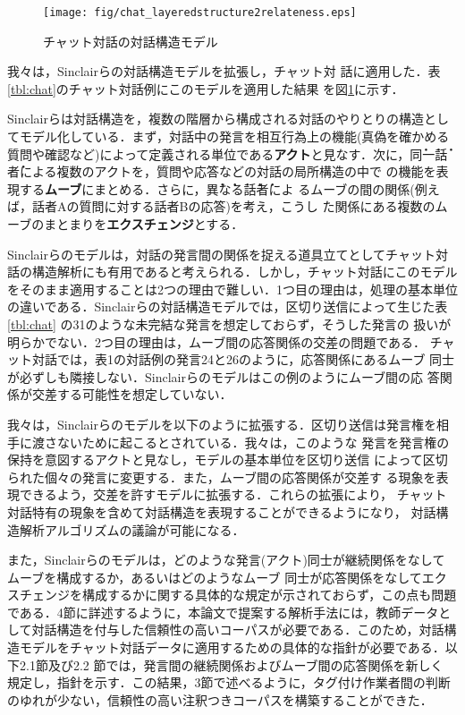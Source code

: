 \begin{figure}[tbt]
 \centerline{
    \texttt{[image: fig/chat\_layeredstructure2relateness.eps]}
  }  
  \caption{チャット対話の対話構造モデル}
  \label{fig:chat_layeredstructure2relateness}
\end{figure}

我々は，Sinclairらの対話構造モデル\cite{Sinclair:92}を拡張し，チャット対
話に適用した．表\ref{tbl:chat}のチャット対話例にこのモデルを適用した結果
を図\ref{fig:chat_layeredstructure2relateness}に示す．

Sinclairらは対話構造を，複数の階層から構成される対話のやりとりの構造とし
てモデル化している．まず，対話中の発言を相互行為上の機能(真偽を確かめる
質問や確認など)によって定義される単位である{\bf アクト}と見なす．次に，\.
同\.一\.話\.者による複数のアクトを，質問や応答などの対話の局所構造の中で
の機能を表現する{\bf ムーブ}にまとめる．さらに，\.異\.な\.る\.話\.者によ
るムーブの間の関係(例えば，話者Aの質問に対する話者Bの応答)を考え，こうし
た関係にある複数のムーブのまとまりを{\bf エクスチェンジ}とする．

Sinclairらのモデルは，対話の発言間の関係を捉える道具立てとしてチャット対
話の構造解析にも有用であると考えられる．しかし，チャット対話にこのモデル
をそのまま適用することは2つの理由で難しい．1つ目の理由は，処理の基本単位
の違いである．Sinclairらの対話構造モデルでは，区切り送信によって生じた表
\ref{tbl:chat} の31のような未完結な発言を想定しておらず，そうした発言の
扱いが明らかでない．2つ目の理由は，ムーブ間の応答関係の交差の問題である．
チャット対話では，表1の対話例の発言24と26のように，応答関係にあるムーブ
同士が必ずしも隣接しない．Sinclairらのモデルはこの例のようにムーブ間の応
答関係が交差する可能性を想定していない．

我々は，Sinclairらのモデルを以下のように拡張する．区切り送信は発言権を相
手に渡さないために起こるとされている\cite{Hosoma:00}．我々は，このような
発言を発言権の保持を意図するアクトと見なし，モデルの基本単位を区切り送信
によって区切られた個々の発言に変更する．また，ムーブ間の応答関係が交差す
る現象を表現できるよう，交差を許すモデルに拡張する．これらの拡張により，
チャット対話特有の現象を含めて対話構造を表現することができるようになり，
対話構造解析アルゴリズムの議論が可能になる．

また，Sinclairらのモデルは，どのような発言(アクト)同士が継続関係をなして
ムーブを構成するか，あるいはどのようなムーブ 同士が応答関係をなしてエク
スチェンジを構成するかに関する具体的な規定が示されておらず，この点も問題
である．4節に詳述するように，本論文で提案する解析手法には，教師データと
して対話構造を付与した信頼性の高いコーパスが必要である．このため，対話構
造モデルをチャット対話データに適用するための具体的な指針が必要である．以
下2.1節及び2.2 節では，発言間の継続関係およびムーブ間の応答関係を新しく
規定し，指針を示す．この結果，3節で述べるように，タグ付け作業者間の判断
のゆれが少ない，信頼性の高い注釈つきコーパスを構築することができた． 

